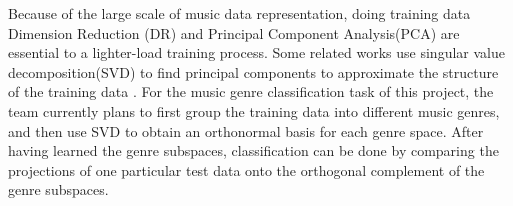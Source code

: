 \begin{par}
    Because of the large scale of music data representation, doing training data Dimension Reduction (DR) and Principal Component Analysis(PCA) are essential to a lighter-load training process. Some related works use singular value decomposition(SVD) to find principal components to approximate the structure of the training data \cite{pca}. For the music genre classification task of this project, the team currently plans to first group the training data into different music genres, and then use SVD to obtain an orthonormal basis for each genre space. After having learned the genre subspaces, classification can be done by comparing the projections of one particular test data onto the orthogonal complement of the genre subspaces.
\end{par}
